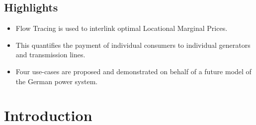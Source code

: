 \documentclass[11pt,twocolumn]{article}
\newcommand{\vpad}{\vspace{1mm}}
\newcommand{\generation}{g_{s,t}}
\newcommand{\nodalgeneration}[1][n]{g_{#1,t}}
\newcommand{\flow}{f_{\ell,t}}
\newcommand{\lmp}[1][n]{\lambda_{#1,t}}
\newcommand{\demand}[1][n]{d_{#1,t}}
\begin{document}
\subsection*{Highlights}
\begin{itemize}
    \item Flow Tracing is used to interlink optimal Locational Marginal Prices.
    \item This quantifies the payment of individual consumers to individual generators and transmission lines.
    \item Four use-cases are proposed and demonstrated on behalf of a future model of the German power system.
\end{itemize}




\section{Introduction}
\end{document}
